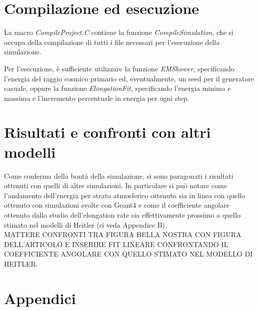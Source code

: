 \documentclass[10pt,a4paper,usenatbib]{article}
\begin{document}
\section{Compilazione ed esecuzione}
La macro \textit{CompileProject.C} contiene la funzione \textit{CompileSimulation}, che si occupa della compilazione di tutti i file necessari per l'esecuzione della simulazione.

Per l'esecuzione, è sufficiente utilizzare la funzione \textit{EMShower}, specificando l'energia del raggio cosmico primario ed, eventualmente, un seed per il generatore casuale, oppure la funzione \textit{ElongationFit}, specificando l'energia minima e massima e l'incremento percentuale in energia per ogni step.

\section{Risultati e confronti con altri modelli}
Come conferma della bontà della simulazione, si sono paragonati i risultati ottenuti con quelli di altre simulazioni. In particolare si può notare come l'andamento dell'energia per strato atmosferico ottenuto sia in linea con quello ottenuto con simulazioni svolte con Geant4 e come il coefficiente angolare ottenuto dallo studio dell'elongation rate sia effettivamente prossimo a quello stimato nel modelli di Heitler (si veda Appendice B). 
\\MATTERE CONFRONTI TRA FIGURA BELLA NOSTRA CON FIGURA DELL'ARTICOLO E INSERIRE FIT LINEARE CONFRONTANDO IL COEFFICIENTE ANGOLARE CON QUELLO STIMATO NEL MODELLO DI HEITLER. 


\pagebreak
\appendix
\section{Appendici}
\end{document}
